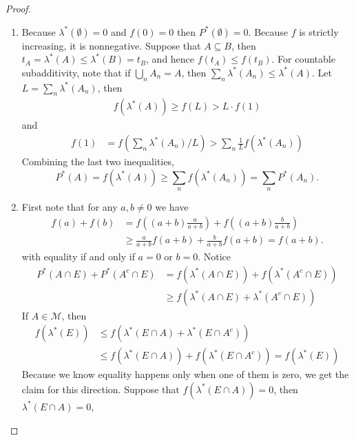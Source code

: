 \documentclass[11pt]{article}
\newcommand{\seq}{\subseteq}
\newcommand{\es}{\emptyset}
\newcommand{\mc}{\mathcal}
\newcommand{\ic}{\cap}
\begin{document}
\begin{proof}
    \begin{enumerate}
        \item Because $\lambda^{\ast} (\es) = 0$ and $f(0) = 0$ then $P^{\ast} (\es) = 0$. Because $f$ is strictly increasing, it is nonnegative. Suppose that $A \seq B$, then $t_A = \lambda^{\ast} (A) \leq \lambda^{\ast} (B) = t_B$, and hence $f(t_A) \leq f(t_B)$.
        For countable subadditivity, note that if $\bigcup_n A_n = A$, then $\sum_n \lambda^{\ast} (A_n) \leq \lambda^{\ast} (A)$. Let $L = \sum_n \lambda^{\ast} (A_n)$, then
        \begin{align*}
            f(\lambda^{\ast} (A)) \geq f(L) > L \cdot f(1)
        \end{align*}
        and
        \begin{align*}
            f( 1 ) &= f \left ( \sum_n \lambda^{\ast} (A_n)/L \right ) > \sum_n \frac{1}{L} f \left ( \lambda^{\ast} (A_n) \right)
        \end{align*}
        Combining the last two inequalities,
        \[ P^\ast (A) = f(\lambda^\ast (A)) \geq \sum_n f(\lambda^{\ast} (A_n)) = \sum_n P^\ast (A_n). \]
        \item First note that for any $a, b \neq 0$ we have
        \begin{align*}
            f(a) + f(b) &= f\left ((a+b) \frac{a}{a+b} \right) + f\left((a+b) \frac{b}{a+b} \right) \\
            &\geq \frac{a}{a+b} f(a+b) + \frac{b}{a+b} f(a+b) = f(a+b).
        \end{align*}
        with equality if and only if $a = 0$ or $b = 0$. Notice
        \begin{align*}
            P^{\ast} (A \ic E) + P^{\ast} (A^c \ic E) &= f(\lambda^{\ast} (A \ic E)) + f(\lambda^\ast (A^c \ic E)) \\
            &\geq f(\lambda^{\ast} (A \ic E) + \lambda^{\ast} (A^c \ic E))
        \end{align*}
        If $A \in \mc M$, then
        \begin{align*}
            f(\lambda^{\ast} (E)) &\leq f( \lambda^{\ast} (E \ic A) + \lambda^{\ast} (E \ic A^c) ) \\
            &\leq f(\lambda^{\ast} (E \ic A)) + f(\lambda^{\ast} (E \ic A^c)) = f(\lambda^{\ast} (E))
        \end{align*}
        Because we know equality happens only when one of them is zero, we get the claim for this direction. Suppose that $f(\lambda^{\ast} (E \ic A)) = 0$, then $\lambda^\ast (E \ic A) = 0$,

\end{enumerate}
\end{proof}
\end{document}
